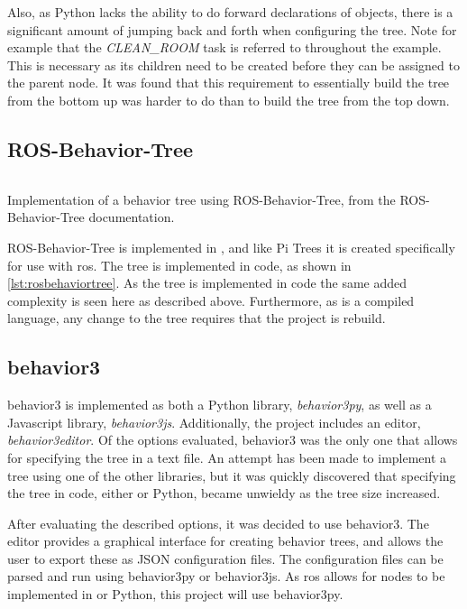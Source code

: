 \documentclass[\rootfolder/main.tex]{subfiles}
\begin{document}
Also, as Python lacks the ability to do forward declarations of objects, there is a significant amount of jumping back and forth when configuring the tree.
Note for example that the \emph{CLEAN\_ROOM} task is referred to throughout the example.
This is necessary as its children need to be created before they can be assigned to the parent node.
It was found that this requirement to essentially build the tree from the bottom up was harder to do than to build the tree from the top down.

\subsection{ROS-Behavior-Tree}

\begin{listing}
    \inputminted[fontsize=\scriptsize]{Python}{\rootfolder/Chapters/Chapter3/Listings/rosbehaviortree.cpp}
    \caption[Implementation of a behavior tree using ROS-Behavior-Tree]{Implementation of a behavior tree using ROS-Behavior-Tree, from the ROS-Behavior-Tree documentation.}
    \label{lst:rosbehaviortree}
\end{listing}

ROS-Behavior-Tree is implemented in \CC, and like Pi Trees it is created specifically for use with \acrshort{ros}.
The tree is implemented in code, as shown in \cref{lst:rosbehaviortree}.
As the tree is implemented in code the same added complexity is seen here as described above.
Furthermore, as \CC is a compiled language, any change to the tree requires that the project is rebuild.

\subsection{behavior3}

behavior3 is implemented as both a Python library, \emph{behavior3py}, as well as a Javascript library, \emph{behavior3js}.
Additionally, the project includes an editor, \emph{behavior3editor}.
Of the options evaluated, behavior3 was the only one that allows for specifying the tree in a text file.
An attempt has been made to implement a tree using one of the other libraries, but it was quickly discovered that specifying the tree in code, either \CC or Python, became unwieldy as the tree size increased.

After evaluating the described options, it was decided to use behavior3.
The editor provides a graphical interface for creating behavior trees, and allows the user to export these as JSON configuration files.
The configuration files can be parsed and run using behavior3py or behavior3js.
As \acrshort{ros} allows for nodes to be implemented in \CC or Python, this project will use behavior3py.
\end{document}
